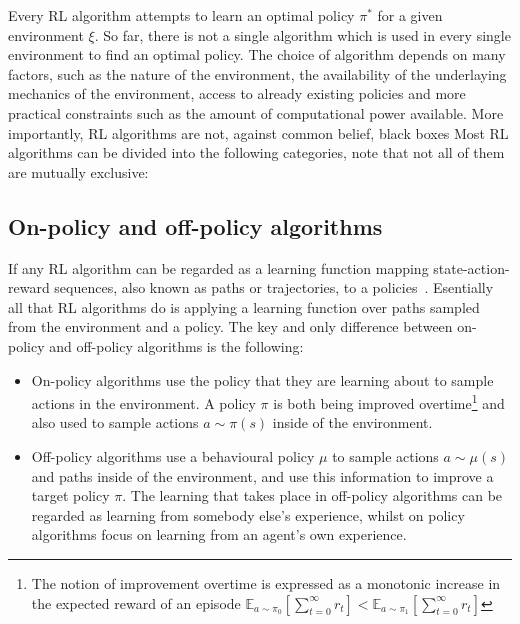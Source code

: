 \documentclass{../main.tex}{}
\begin{document}


Every RL algorithm attempts to learn an optimal policy $\pi^*$ for a given environment $\xi$. So far, there is not a single algorithm which is used in every single environment to find an optimal policy. The choice of algorithm depends on many factors, such as the nature of the environment, the availability of the underlaying mechanics of the environment, access to already existing policies and more practical constraints such as the amount of computational power available. More importantly, RL algorithms are not, against common belief, black boxes Most RL algorithms can be divided into the following categories, note that not all of them are mutually exclusive:

\subsection{On-policy and off-policy algorithms}

If any RL algorithm can be regarded as a learning function mapping state-action-reward sequences, also known as paths or trajectories, to a policies~\citep{Laurent2011}. Esentially all that RL algorithms do is applying a learning function over paths sampled from the environment and a policy. The key and only difference between on-policy and off-policy algorithms is the following:
\begin{itemize}
    \item On-policy algorithms use the policy that they are learning about to sample actions in the environment. A policy $\pi$ is both being improved overtime\footnote{The notion of improvement overtime is expressed as a monotonic increase in the expected reward of an episode $\mathbb{E}_{a \sim \pi_0}[\sum_{t=0}^{\infty}r_t] < \mathbb{E}_{a \sim \pi_1}[\sum_{t=0}^{\infty}r_t]$} and also used to sample actions $a \sim \pi(s)$ inside of the environment.
    \item Off-policy algorithms use a behavioural policy $\mu$ to sample actions $a \sim \mu(s)$ and paths inside of the environment, and use this information to improve a target policy $\pi$. The learning that takes place in off-policy algorithms can be regarded as learning from somebody else's experience, whilst on policy algorithms focus on learning from an agent's own experience.
\end{itemize}
\end{document}
